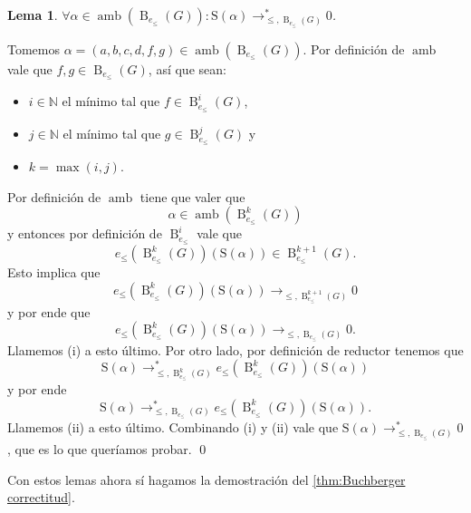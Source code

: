 \documentclass[12pt]{report}
\theoremstyle{customstyle}
\newtheorem{lemma}[theorem]{Lema}
\renewenvironment{proof}[1][\proofname]{{\noindent \bfseries #1: }}{\qed} %
\theoremstyle{factstyle}
\DeclareMathOperator{\amb}{amb}
\renewcommand{\S}{\text{S}}
\DeclareMathOperator{\B}{B}
\begin{document}
\begin{lemma}\label{lemma:Buchberger correctitud:6}
  $∀α ∈ \amb(\B_{e_≤}(G)) : \S(α) →^*_{≤, \B_{e_≤}(G)} 0$.
\end{lemma}
\begin{proof}
  Tomemos $α = (a, b, c, d, f, g) ∈ \amb(\B_{e_≤}(G))$. Por definición de $\amb$ vale que $f, g ∈ \B_{e_≤}(G)$, así que sean:
  \begin{itemize}
    \item $i ∈ ℕ$ el mínimo tal que $f ∈ \B_{e_≤}^i(G)$,
    \item $j ∈ ℕ$ el mínimo tal que $g ∈ \B_{e_≤}^j(G)$ y
    \item $k = \max(i, j)$.
  \end{itemize}

  \noindent Por definición de $\amb$ tiene que valer que
  \[ α ∈ \amb(\B_{e_≤}^k(G)) \]
  y entonces por definición de $\B_{e_≤}^i$ vale que
  \[ e_≤(\B_{e_≤}^k(G))(\S(α)) ∈ \B_{e_≤}^{k + 1}(G) \text{.} \]
  Esto implica que
  \[ e_≤(\B_{e_≤}^k(G))(\S(α)) →_{≤, \B_{e_≤}^{k + 1}(G)} 0\]
  y por ende que
  \[ e_≤(\B_{e_≤}^k(G))(\S(α)) →_{≤, \B_{e_≤}(G)} 0 \text{.} \]
  Llamemos (i) a esto último. Por otro lado, por definición de reductor tenemos que
  \[ \S(α) →^*_{≤, \B_{e_≤}^k(G)} e_≤(\B_{e_≤}^k(G))(\S(α)) \]
  y por ende
  \[ \S(α) →^*_{≤, \B_{e_≤}(G)} e_≤(\B_{e_≤}^k(G))(\S(α)) \text{.} \]
  Llamemos (ii) a esto último. Combinando (i) y (ii) vale que $\S(α) →^*_{≤, \B_{e_≤}(G)} 0$, que es lo que queríamos probar.
\end{proof}

Con estos lemas ahora sí hagamos la demostración del \cref{thm:Buchberger correctitud}.
\end{document}
